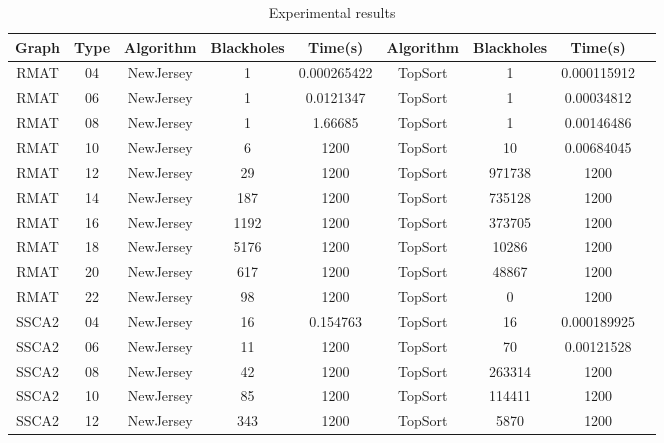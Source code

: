 \documentclass{svproc}
\begin{document}
\begin{table}[]
\caption{Experimental results}
\label{tabular:tableresults}
\begin{center}
\begin{tabular}{c|c|c|c|c|c|c|c|c}
Graph & Type & Algorithm & Blackholes & Time(s) & Algorithm & Blackholes & Time(s) \\
\hline
RMAT & 04 & NewJersey & 1 & 0.000265422 & TopSort & 1 & 0.000115912 \\
RMAT & 06 & NewJersey & 1 & 0.0121347 & TopSort & 1 & 0.00034812 \\
RMAT & 08 & NewJersey & 1 & 1.66685 & TopSort & 1 & 0.00146486 \\
RMAT & 10 & NewJersey & 6 & 1200 & TopSort & 10 & 0.00684045 \\
RMAT & 12 & NewJersey & 29 & 1200 & TopSort & 971738 & 1200 \\
RMAT & 14 & NewJersey & 187 & 1200 & TopSort & 735128 & 1200 \\
RMAT & 16 & NewJersey & 1192 & 1200 & TopSort & 373705 & 1200 \\
RMAT & 18 & NewJersey & 5176 & 1200 & TopSort & 10286 & 1200 \\
RMAT & 20 & NewJersey & 617 & 1200 & TopSort & 48867 & 1200 \\
RMAT & 22 & NewJersey & 98 & 1200 & TopSort & 0 & 1200 \\
SSCA2 & 04 & NewJersey & 16 & 0.154763 & TopSort & 16 & 0.000189925 \\
SSCA2 & 06 & NewJersey & 11 & 1200 & TopSort & 70 & 0.00121528 \\
SSCA2 & 08 & NewJersey & 42 & 1200 & TopSort & 263314 & 1200 \\
SSCA2 & 10 & NewJersey & 85 & 1200 & TopSort & 114411 & 1200 \\
SSCA2 & 12 & NewJersey & 343 & 1200 & TopSort & 5870 & 1200 \\
\end{tabular}
\end{center}
\end{table}
\end{document}
